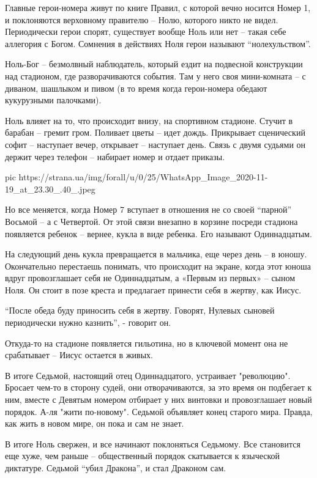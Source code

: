 Главные герои-номера живут по книге Правил, с которой вечно носится Номер
1, и поклоняются верховному правителю – Нолю, которого никто не видел.
Периодически герои спорят, существует вообще Ноль или нет – такая себе
аллегория с Богом. Сомнения в действиях Ноля герои называют
\enquote{нолехульством}.

Ноль-Бог – безмолвный наблюдатель, который ездит на подвесной конструкции
над стадионом, где разворачиваются события. Там у него своя мини-комната –
с диваном, шашлыком и пивом (в то время когда герои-номера обедают
кукурузными палочками).

Ноль влияет на то, что происходит внизу, на спортивном стадионе. Стучит в
барабан – гремит гром. Поливает цветы – идет дождь. Прикрывает сценический
софит – наступает вечер, открывает – наступает день. Связь с двумя судьями
он держит через телефон – набирает номер и отдает приказы.

\ifcmt
pic https://strana.ua/img/forall/u/0/25/WhatsApp_Image_2020-11-19_at_23.30_.40_.jpeg
\fi

Но все меняется, когда Номер 7 вступает в отношения не со своей \enquote{парной}
Восьмой – а с Четвертой. От этой связи внезапно в корзине посреди стадиона
появляется ребенок – вернее, кукла в виде ребенка. Его называют
Одиннадцатым.

На следующий день кукла превращается в мальчика, еще через день – в юношу.
Окончательно перестаешь понимать, что происходит на экране, когда этот
юноша вдруг провозглашает себя не Одиннадцатым, а «Первым из первых» –
сыном Ноля. Он стоит в позе креста и предлагает принести себя в жертву,
как Иисус.

\enquote{После обеда буду приносить себя в жертву. Говорят, Нулевых сыновей
периодически нужно казнить}, - говорит он.

Откуда-то на стадионе появляется гильотина, но в ключевой момент она не
срабатывает – Иисус остается в живых.

В итоге Седьмой, настоящий отец Одиннадцатого, устраивает "революцию".
Бросает чем-то в сторону судей, они отворачиваются, за это время он
подбегает к ним, вместе с Девятым номером отбирает у них винтовки и
провозглашает новый порядок. А-ля "жити по-новому". Седьмой объявляет
конец старого мира. Правда, как жить в новом мире, он пока и сам не знает.

В итоге Ноль свержен, и все начинают поклоняться Седьмому. Все становится
еще хуже, чем раньше – общественный порядок скатывается к языческой
диктатуре. Седьмой \enquote{убил Дракона}, и стал Драконом сам.

